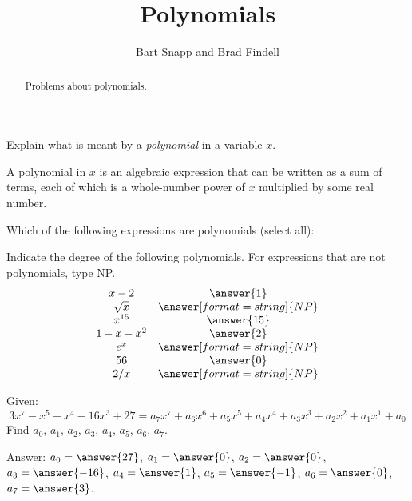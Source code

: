 \documentclass[nooutcomes]{ximera}
\title{Polynomials}
\author{Bart Snapp and Brad Findell}
\begin{document}
\begin{abstract}
Problems about polynomials.
\end{abstract}
\maketitle

\begin{problem}Explain what is meant by a \textit{polynomial} in a variable $x$.  
\begin{freeResponse}
\begin{hint}
A polynomial in $x$ is an algebraic expression that can be written as a sum of terms, each of which is a whole-number power of $x$ multiplied by some real number.  
\end{hint}
\end{freeResponse}
\end{problem} 

\begin{problem}
Which of the following expressions are polynomials (select all):
  \begin{selectAll}  
  \end{selectAll}  
\end{problem}

\begin{problem}
Indicate the degree of the following polynomials.  For expressions that are not polynomials, type NP.
\[
\begin{array}{cc}
 x-2 &     \answer{1} \\
 \sqrt{x} & \answer[format=string]{NP} \\
 x^{15}  & \answer{15} \\
 1-x-x^2 & \answer{2} \\
 e^x     & \answer[format=string]{NP} \\
 56      & \answer{0} \\
 2/x & \answer[format=string]{NP}  
\end{array}
\]
\end{problem}

\begin{problem}Given:
\[
3x^7 -x^5 + x^4 -16x^3 + 27 = a_7 x^7 + a_6x^6 + a_5x^5 + a_4x^4 + a_3x^3 + a_2x^2 + a_1x^1 + a_0
\]
Find $a_0$, $a_1$, $a_2$, $a_3$, $a_4$, $a_5$, $a_6$, $a_7$.

Answer: $a_0=\answer{27}$, $a_1=\answer{0}$, $a_2=\answer{0}$, $a_3=\answer{-16}$, $a_4=\answer{1}$, $a_5=\answer{-1}$, $a_6=\answer{0}$, $a_7=\answer{3}$.
\end{problem} 
\end{document}
